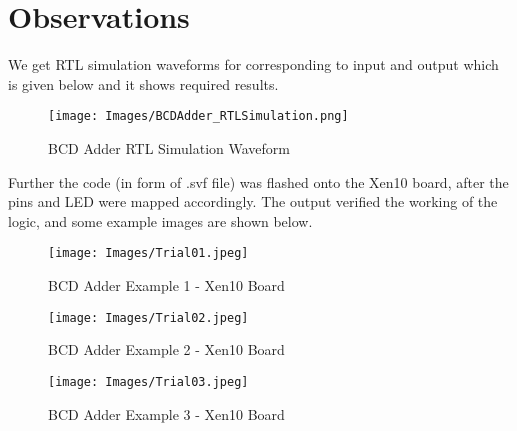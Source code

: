 \documentclass[12pt]{article}
\begin{document}
\section{Observations}
 
We get RTL simulation waveforms for corresponding to input and output which is given below and it shows required results.

\begin{figure}[H]
\centering
  \texttt{[image: Images/BCDAdder\_RTLSimulation.png]}
  \caption{BCD Adder RTL Simulation Waveform}
\end{figure}

Further the code (in form of .svf file) was flashed onto the Xen10 board, after the pins and LED were mapped accordingly. The output verified the working of the logic, and some example images are shown below.

\begin{figure}[H]
\centering
  \texttt{[image: Images/Trial01.jpeg]}
  \caption{BCD Adder Example 1 - Xen10 Board}
\end{figure}

\begin{figure}[H]
\centering
  \texttt{[image: Images/Trial02.jpeg]}
  \caption{BCD Adder Example 2 - Xen10 Board}
\end{figure}

\begin{figure}[H]
\centering
  \texttt{[image: Images/Trial03.jpeg]}
  \caption{BCD Adder Example 3 - Xen10 Board}
\end{figure}
\end{document}

